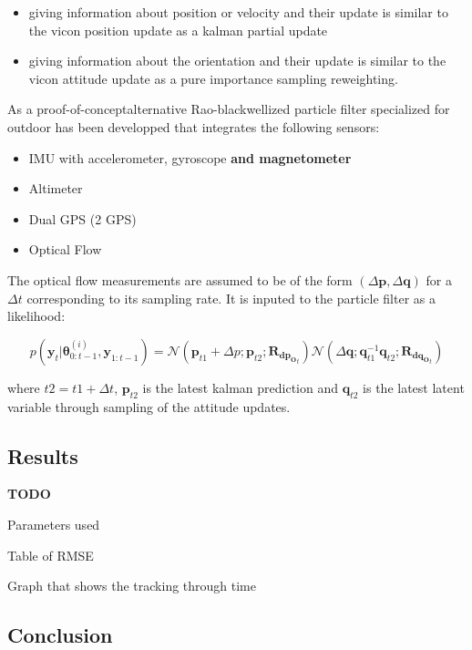 \documentclass[12pt,]{article}
\providecommand{\tightlist}{%
  \setlength{\itemsep}{0pt}\setlength{\parskip}{0pt}}
\begin{document}
\begin{itemize}
\tightlist
\item
  giving information about position or velocity and their update is
  similar to the vicon position update as a kalman partial update
\item
  giving information about the orientation and their update is similar
  to the vicon attitude update as a pure importance sampling
  reweighting.
\end{itemize}

As a proof-of-conceptalternative Rao-blackwellized particle filter
specialized for outdoor has been developped that integrates the
following sensors:

\begin{itemize}
\tightlist
\item
  IMU with accelerometer, gyroscope \textbf{and magnetometer}
\item
  Altimeter
\item
  Dual GPS (2 GPS)
\item
  Optical Flow
\end{itemize}

The optical flow measurements are assumed to be of the form
\((\Delta \mathbf{p}, \Delta \mathbf{q})\) for a \(\Delta t\)
corresponding to its sampling rate. It is inputed to the particle filter
as a likelihood:

\[p(\mathbf{y}_t | \boldsymbol{\theta}^{(i)}_{0:t-1}, \mathbf{y}_{1:t-1}) = \mathcal{N}(\mathbf{p}_{t1} + \Delta p; \mathbf{p}_{t2}; \mathbf{R}_{\mathbf{dp_O}_t})\mathcal{N}(\Delta \mathbf{q}; \mathbf{q}_{t1}^{-1}\mathbf{q}_{t2}; \mathbf{R}_{\mathbf{dq_O}_t})\]

where \(t2 = t1 + \Delta t\), \(\mathbf{p}_{t2}\) is the latest kalman
prediction and \(\mathbf{q}_{t2}\) is the latest latent variable through
sampling of the attitude updates.

\subsection{Results}\label{results}

\textbf{TODO}

Parameters used

Table of RMSE

Graph that shows the tracking through time

\subsection{Conclusion}\label{conclusion}
\end{document}
